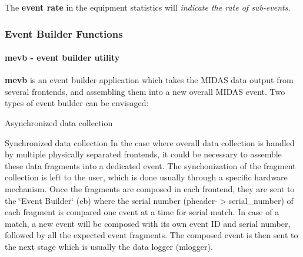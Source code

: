 \begin{DoxyItemize}
\item The {\bfseries  event rate } in the equipment statistics will {\itshape  indicate the rate of sub-\/events\/}.
\end{DoxyItemize}

\par
 

\par
 \label{index_end}
\hypertarget{index_end}{}
 \subsubsection{Event Builder Functions}\label{FE_Event_Builder}
\par
 

\par
 \label{FE_Event_Builder_idx_mevb-utility}
\hypertarget{FE_Event_Builder_idx_mevb-utility}{}
 \label{FE_Event_Builder_idx_event_builder_utility-see-mevb}
\hypertarget{FE_Event_Builder_idx_event_builder_utility-see-mevb}{}




 \hypertarget{FE_Event_Builder_FE_mevb_utility}{}\paragraph{mevb -\/ event builder utility}\label{FE_Event_Builder_FE_mevb_utility}
{\bfseries mevb} is an event builder application which takes the MIDAS data output from several frontends, and assembling them into a new overall MIDAS event. Two types of event builder can be envisaged:
\begin{DoxyItemize}
\item Asynchronized data collection
\begin{DoxyItemize}
\item Synchronized data collection In the case where overall data collection is handled by multiple physically separated frontends, it could be necessary to assemble these data fragments into a dedicated event. The synchonization of the fragment collection is left to the user, which is done usually through a specific hardware mechanism. Once the fragments are composed in each frontend, they are sent to the \char`\"{}Event Builder\char`\"{} (eb) where the serial number (pheader-\/$>$serial\_\-number) of each fragment is compared one event at a time for serial match. In case of a match, a new event will be composed with its own event ID and serial number, followed by all the expected event fragments. The composed event is then sent to the next stage which is usually the data logger (mlogger).
\end{DoxyItemize}
\end{DoxyItemize}


